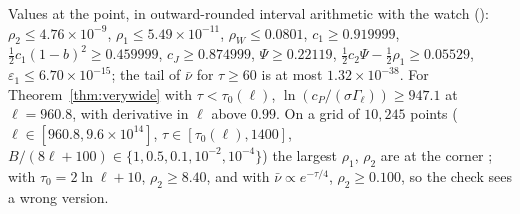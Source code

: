 Values at the point, in outward-rounded interval arithmetic with the watch (): $\rho_2\le4.76\times10^{-9}$, $\rho_1\le5.49\times10^{-11}$, $\rho_W\le0.0801$, $c_1\ge0.919999$, $\frac12c_1(1-b)^2\ge0.459999$, $c_J\ge0.874999$, $\Psi\ge0.22119$, $\frac12c_2\Psi-\frac12\rho_1\ge0.05529$, $\varepsilon_1\le6.70\times10^{-15}$; the tail of $\bar\nu$ for $\tau\ge60$ is at most $1.32\times10^{-38}$.
For Theorem~\ref{thm:verywide} with $\tau<\tau_0(\ell)$, $\ln(c_P/(\sigma\Gamma_\ell))\ge947.1$ at $\ell=960.8$, with derivative in $\ell$ above $0.99$.
On a grid of $10{,}245$ points ($\ell\in[960.8,9.6\times10^{14}]$, $\tau\in[\tau_0(\ell),1400]$, $B/(8\ell+100)\in\{1,0.5,0.1,10^{-2},10^{-4}\}$) the largest $\rho_1$, $\rho_2$ are at the corner \numst; with $\tau_0=2\ln\ell+10$, $\rho_2\ge8.40$, and with $\bar\nu\propto e^{-\tau/4}$, $\rho_2\ge0.100$, so the check sees a wrong version.
